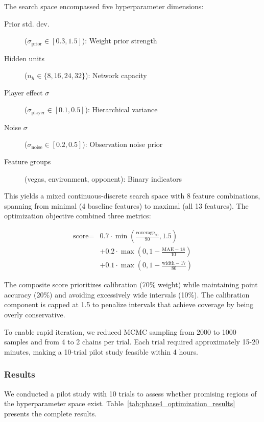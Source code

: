 The search space encompassed five hyperparameter dimensions:

\begin{description}
    \item[Prior std. dev.] ($\sigma_{\text{prior}} \in [0.3, 1.5]$): Weight prior strength
    \item[Hidden units] ($n_h \in \{8, 16, 24, 32\}$): Network capacity
    \item[Player effect $\sigma$] ($\sigma_{\text{player}} \in [0.1, 0.5]$): Hierarchical variance
    \item[Noise $\sigma$] ($\sigma_{\text{noise}} \in [0.2, 0.5]$): Observation noise prior
    \item[Feature groups] (vegas, environment, opponent): Binary indicators
\end{description}

This yields a mixed continuous-discrete search space with 8 feature combinations, spanning from minimal (4 baseline features) to maximal (all 13 features). The optimization objective combined three metrics:

\begin{equation}
\begin{split}
    \text{score} = & 0.7 \cdot \min\left(\frac{\text{coverage}_{90}}{90}, 1.5\right) \\
    & + 0.2 \cdot \max\left(0, 1 - \frac{\text{MAE} - 18}{10}\right) \\
    & + 0.1 \cdot \max\left(0, 1 - \frac{\text{width} - 17}{80}\right)
\end{split}
\end{equation}

The composite score prioritizes calibration (70\% weight) while maintaining point accuracy (20\%) and avoiding excessively wide intervals (10\%). The calibration component is capped at 1.5 to penalize intervals that achieve coverage by being overly conservative.

To enable rapid iteration, we reduced MCMC sampling from 2000 to 1000 samples and from 4 to 2 chains per trial. Each trial required approximately 15-20 minutes, making a 10-trial pilot study feasible within 4 hours.

\subsubsection{Results}

We conducted a pilot study with 10 trials to assess whether promising regions of the hyperparameter space exist. Table~\ref{tab:phase4_optimization_results} presents the complete results.

